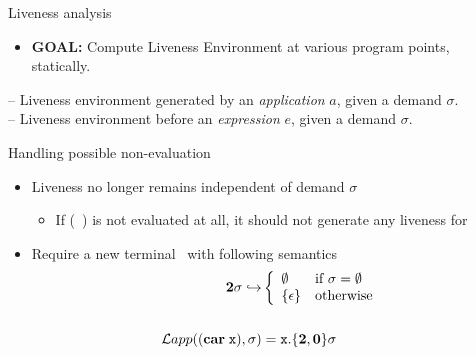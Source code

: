 \documentclass[xcolor=x11names,compress,mathserif]{beamer}
\renewcommand{\(}{\begin{columns}}
\renewcommand{\)}{\end{columns}}
\newcommand{\<}[1]{\begin{column}{#1}}
\renewcommand{\>}{\end{column}}
\begin{document}
\begin{frame}{Liveness analysis}
  \begin{itemize}
  \item {\bf  GOAL:} Compute  Liveness Environment at  various program
    points, statically.
  \end{itemize}
  \bigskip\pause
    --  Liveness  environment  generated  by  an  {\em
    application} $a$, given a demand $\sigma$.\\
  \bigskip
   -- Liveness environment  before an {\em expression}
  $e$, given a demand $\sigma$.

\end{frame}
\begin{frame} {Handling possible non-evaluation}
  \begin{itemize}
  \item Liveness no longer remains independent of demand $\sigma$ \\
    \begin{itemize}
    \item If (\CAR~\px) is not evaluated at all, it should not generate any liveness for \px
    \end{itemize}
  \item Require a new terminal \clazy\ with following semantics
    \begin{align*}
      {\mathbf{2}}\sigma \hookrightarrow & \left\{ 
      \begin{array}{ll}
        \emptyset&\mbox{if}~\sigma = \emptyset\\
        \{\epsilon\} & \mbox{otherwise}
      \end{array}\right.\\ & \\
      \mathcal{L}app((\mbox{$\mathbf{car}$} \;\mbox{\tt x}),\sigma) &= \mbox{\tt x}.\{{\mathbf{2}}, \mathbf{0}\}\sigma
    \end{align*}
  \end{itemize}
\end{frame}
\end{document}
